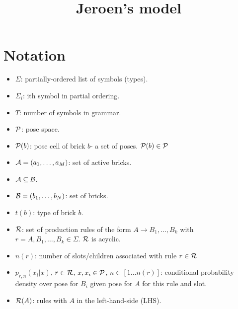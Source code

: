 \documentclass[11pt]{article}
\newcommand{\Pose}{{\cal P}}
\newcommand{\Active}{{\cal A}}
\newcommand{\symb}{\Sigma}
\begin{document}
\title{Jeroen's model}
\maketitle

\section{Notation}

\begin{itemize}

\item $\symb$: partially-ordered list of symbols (types).

\item $\symb_i$: ith symbol in partial ordering.

\item $T$: number of symbols in grammar.

\item $\Pose$: pose space.

\item $\Pose(b)$: pose cell of brick $b$- a set of poses. $\Pose(b) \in \Pose$ 

\item $\Active = (a_1,\ldots,a_M)$: set of active bricks.

\item $\Active \subseteq {\cal B}$.

\item ${\cal B} = (b_1,\ldots,b_N)$: set of bricks.

\item $t(b)$: type of brick $b$.

\item ${\cal R}$: set of production rules of the form
$A \rightarrow B_1,\ldots,B_k$ with $r = A,B_1,\ldots,B_k \in \Sigma$. ${\cal R}$ is acyclic.

\item $n(r)$: number of slots/children associated with rule $r \in {\cal R}$


\item $p_{r,n}(x_i|x)$, $r \in {\cal R}$, $x,x_i \in {\cal P}$, $n \in [1...n(r)]$: 
conditional probability density over pose for $B_i$ given pose for $A$ for this rule and slot.

\item ${\cal R}(A)$: rules with $A$ in the left-hand-side (LHS).


\end{itemize}
\end{document}
